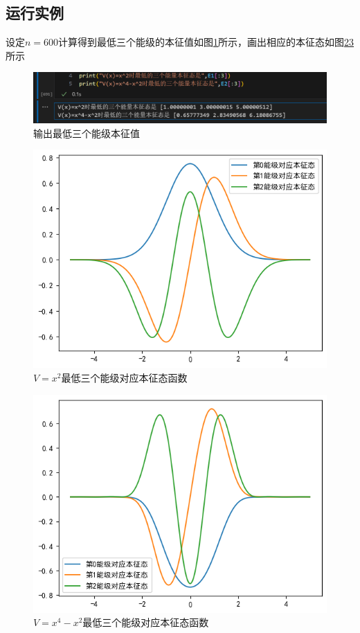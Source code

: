 \documentclass[11pt]{article}
\begin{document}
\subsection{运行实例}
设定$n=600$计算得到最低三个能级的本征值如图\ref{fig:输出最低三个能级本征值}所示，画出相应的本征态如图\ref{fig:V1最低三个能级对应本征态函数}\ref{fig:V2最低三个能级对应本征态函数}所示
\begin{figure}
    \centering
    \includegraphics[width=0.5\linewidth]{T3输出实例.png}
    \caption{输出最低三个能级本征值}
    \label{fig:输出最低三个能级本征值}
\end{figure}
\begin{figure}
    \centering
    \includegraphics[width=0.5\linewidth]{V1本征态.png}
    \caption{$V=x^2$最低三个能级对应本征态函数}
    \label{fig:V1最低三个能级对应本征态函数}
\end{figure}
\begin{figure}
    \centering
    \includegraphics[width=0.5\linewidth]{V2本征态.png}
    \caption{$V=x^4-x^2$最低三个能级对应本征态函数}
    \label{fig:V2最低三个能级对应本征态函数}
\end{figure}
\end{document}
